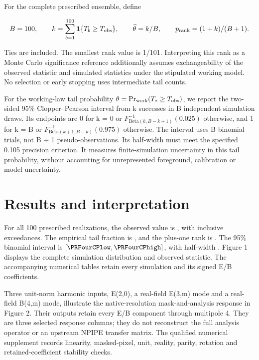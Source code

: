 \documentclass[aps,prd,reprint,onecolumn,nofootinbib]{revtex4-2}
\begin{document}
For the complete prescribed ensemble, define

\[
 B=100,\qquad k=\sum_{b=1}^{100}{\bf1}\{T_b\ge T_{\rm obs}\},
 \qquad \widehat\theta=k/B,\qquad p_{\rm rank}=(1+k)/(B+1).
\]

Ties are included. The smallest rank value is 1/101. Interpreting this
rank as a Monte Carlo significance reference additionally assumes
exchangeability of the observed statistic and simulated statistics under
the stipulated working model. No selection or early stopping uses
intermediate tail counts.

For the working-law tail probability
\(\theta=\Pr_{\rm work}(T_*\ge T_{\rm obs})\), we report the two-sided
95\% Clopper--Pearson interval from k successes in B independent
simulation draws. Its endpoints are 0 for k = 0 or
\(F^{-1}_{\mathrm{Beta}(k,B-k+1)}(0.025)\) otherwise, and 1 for k = B or
\(F^{-1}_{\mathrm{Beta}(k+1,B-k)}(0.975)\) otherwise. The interval uses
B binomial trials, not B + 1 pseudo-observations. Its half-width must
meet the specified 0.105 precision criterion. It measures
finite-simulation uncertainty in this tail probability, without
accounting for unrepresented foreground, calibration or model
uncertainty.

\hypertarget{results-and-interpretation}{%
\section{Results and interpretation}\label{results-and-interpretation}}

For all 100 prescribed realizations, the observed value is
\PRFourTobs{}, with \PRFourK{} inclusive exceedances. The empirical tail
fraction is \PRFourEmpirical{}, and the plus-one rank is \PRFourRank{}.
The 95\% binomial interval is \([\PRFourCPlow,\PRFourCPhigh]\), with
half-width \PRFourCPhalf{}. Figure 1 displays the complete simulation
distribution and observed statistic. The accompanying numerical tables
retain every simulation and its signed E/B coefficients.

Three unit-norm harmonic inputs, E(2,0), a real-field
E(3,\textbar m) mode and a real-field
B(4,\textbar m) mode, illustrate the native-resolution
mask-and-analysis response in Figure 2. Their outputs retain every E/B
component through multipole 4. They are three selected response columns;
they do not reconstruct the full analysis operator or an upstream NPIPE
transfer matrix. The qualified numerical supplement records linearity,
masked-pixel, unit, reality, parity, rotation and retained-coefficient
stability checks.
\end{document}
